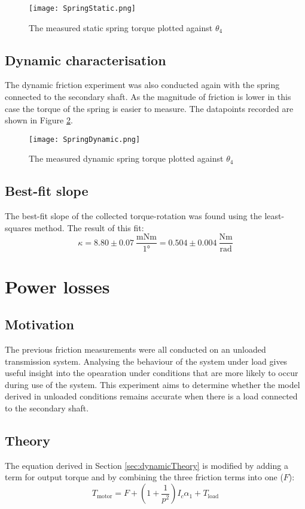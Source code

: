 \documentclass[12pt]{article}
\begin{document}
\begin{figure}[h]
    \centering
    \texttt{[image: SpringStatic.png]}
    \caption{The measured static spring torque plotted against $\theta_4$}
    \label{fig:springStatic}
\end{figure}


\subsection{Dynamic characterisation}
The dynamic friction experiment was also conducted again with the spring connected to the secondary shaft. As the magnitude of friction is lower in this case the torque of the spring is easier to measure. The datapoints recorded are shown in Figure \ref{fig:springDynamic}. 

\begin{figure}
    \centering
    \texttt{[image: SpringDynamic.png]}
    \caption{The measured dynamic spring torque plotted against $\theta_4$}
    \label{fig:springDynamic}
\end{figure}

\subsection{Best-fit slope}
The best-fit slope of the collected torque-rotation was found using the least-squares method. The result of this fit: $$\kappa = 8.80  \pm 0.07 ~\frac{\text{mNm}}{1 \text{°}} = 0.504 \pm 0.004  ~\frac{\text{Nm}}{\text{rad}} $$

\clearpage
\section{Power losses}
\subsection{Motivation}
The previous friction measurements were all conducted on an unloaded transmission system. Analysing the behaviour of the system under load gives useful insight into the opearation under conditions that are more likely to occur during use of the system. This experiment aims to determine whether the model derived in unloaded conditions remains accurate when there is a load connected to the secondary shaft. 

\subsection{Theory}
The equation derived in Section \ref{sec:dynamicTheory} is modified by adding a term for output torque and by combining the three friction terms into one ($F$):
$$T_{\text{motor}} = F + \left(1+\frac{1}{p^2}\right)I_c\alpha_1 + T_{\text{load}}$$
\end{document}
